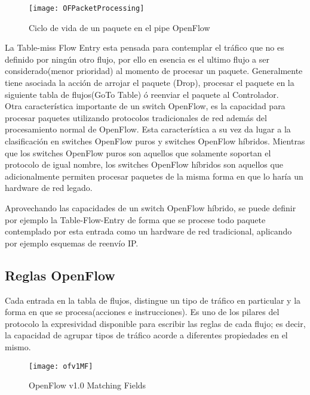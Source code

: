 \begin{figure}[htbp!] 
\centering    
\texttt{[image: OFPacketProcessing]}
\caption[Ciclo de vida de un paquete en pipe OpenFlow]{Ciclo de vida de un paquete en el pipe OpenFlow}
\label{fig:OFPacketProcessing}
\end{figure}


La Table-miss Flow Entry esta pensada para contemplar el tr\'afico que no es definido por ningún otro flujo, por ello en esencia es el ultimo flujo a ser considerado(menor prioridad) al momento de procesar un paquete. Generalmente tiene asociada la acción de arrojar el paquete (Drop), procesar el paquete en la siguiente tabla de flujos(GoTo Table) \'o reenviar el paquete al Controlador.\\

Otra caracter\'istica importante de un switch OpenFlow, es la capacidad para procesar paquetes utilizando protocolos tradicionales de red adem\'as del procesamiento normal de OpenFlow. Esta característica a su vez da lugar a la clasificaci\'on en switches OpenFlow puros y switches OpenFlow h\'ibridos. Mientras que los switches OpenFlow puros son aquellos que solamente soportan el protocolo de igual nombre, los switches OpenFlow h\'ibridos son aquellos que adicionalmente permiten procesar paquetes de la misma forma en que lo har\'ia un hardware de red legado.

Aprovechando las capacidades de un switch OpenFlow h\'ibrido, se puede definir por ejemplo la Table-Flow-Entry de forma que se procese todo paquete contemplado por esta entrada como un hardware de red tradicional, aplicando por ejemplo esquemas de reenvío IP. 

\subsection{Reglas OpenFlow}
Cada entrada en la tabla de flujos, distingue un tipo de tr\'afico en particular y la forma en que se procesa(acciones e instrucciones). Es uno de los pilares del protocolo la expresividad disponible para escribir las reglas de cada flujo; es decir, la capacidad de agrupar tipos de tr\'afico acorde a diferentes propiedades en el mismo.\\

\begin{figure}[h] 
\centering    
\texttt{[image: ofv1MF]}
\caption[OF 1.0 Matching Fields]{OpenFlow v1.0 Matching Fields}
\label{fig:OF10MatchingFields}
\end{figure}


